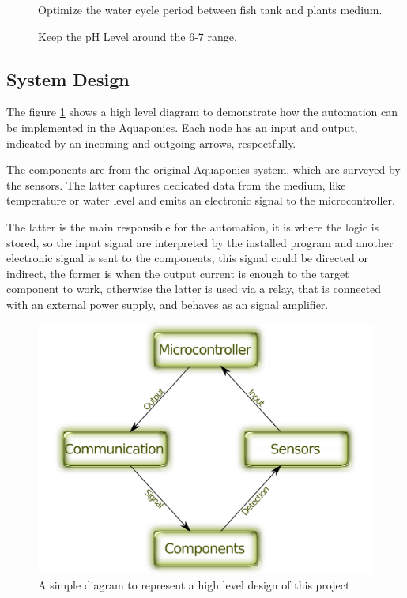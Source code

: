 \begin{description}

\item []
Optimize the water cycle period between fish tank and plants medium.

\item []
Keep the pH Level around the 6-7 range.

\end{description}

\subsection{System Design}
\label{sec:design}

The figure \ref{fig:highLevelSystemDesign} shows a high level diagram to demonstrate how the automation can be implemented in the Aquaponics.
Each node has an input and output,
indicated by an incoming and outgoing arrows, respectfully.

The components are from the original Aquaponics system,
which are surveyed by the sensors.
The latter captures dedicated data from the medium,
like temperature or water level and emits an electronic signal to the microcontroller.

The latter is the main responsible for the automation,
it is where the logic is stored,
so the input signal are interpreted by the installed program and another electronic signal is sent to the components,
this signal could be directed or indirect,
the former is when the output current is enough to the target component to work,
otherwise the latter is used via a relay,
that is connected with an external power supply,
and behaves as an signal amplifier.

\begin{figure}[h]
    \centering
    \includegraphics[width=.7\linewidth]{diagrams/systemDesign}
    \caption{A simple diagram to represent a high level design of this project}
    \label{fig:highLevelSystemDesign}
\end{figure}


